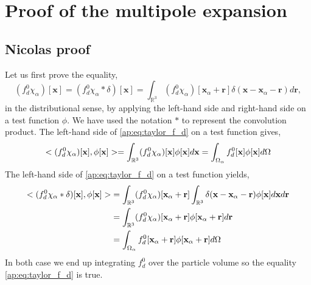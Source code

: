 \section{Proof of the multipole expansion}
\subsection{Nicolas proof}
Let us first prove the equality, 
\begin{equation}
    (f^0_d \chi_\alpha)[\textbf{x}]
    =
    (f^0_d \chi_\alpha * \delta)[\textbf{x}]
    =
    \int_{\mathbb{R}^3} 
     (f^0_d \chi_\alpha)[\textbf{x}_\alpha + \textbf{r}]\delta(\textbf{x} - \textbf{x}_\alpha - \textbf{r}) 
     d\textbf{r},
    \label{ap:eq:taylor_f_d}
\end{equation}
in the distributional sense, by applying the left-hand side and right-hand side on a test function $\phi$.
We have used the notation $*$ to represent the convolution product. 
The left-hand side of \ref{ap:eq:taylor_f_d} on a test function gives, 
\begin{equation}
    < (f^0_d \chi_\alpha)[\textbf{x}], \phi[\textbf{x}]>
    = \int_{\mathbb{R}^3}
    (f^0_d \chi_\alpha)[\textbf{x}] \phi[\textbf{x}]
    d\textbf{x}
    = \int_{\Omega_{\alpha}} 
        f^0_d [\textbf{x}] \phi[\textbf{x}]
         d\Omega
\end{equation}
The left-hand side of \ref{ap:eq:taylor_f_d} on a test function yields, 
\begin{align}
    <   (f^0_d \chi_\alpha *\delta)[\textbf{x}]
    , \phi[\textbf{x}]>
    &= 
    \int_{\mathbb{R}^3}
    (f^0_d \chi_\alpha)[\textbf{x}_\alpha + \textbf{r}]
    \int_{\mathbb{R}^3} 
     \delta(\textbf{x} - \textbf{x}_\alpha - \textbf{r}) 
     \phi[\textbf{x}]
     d\textbf{x}
     d\textbf{r}\\
    &= 
    \int_{\mathbb{R}^3}
    (f^0_d \chi_\alpha)[\textbf{x}_\alpha + \textbf{r}]
     \phi[\textbf{x}_\alpha + \textbf{r}]
     d\textbf{r}
    \\
    &=\intO{
        f^0_d [\textbf{x}_\alpha + \textbf{r}]
        \phi[\textbf{x}_\alpha + \textbf{r}]
    }
    \label{eq:second_equality}
\end{align}
In both case we end up integrating $f_d^0$ over the particle volume so the equality \ref{ap:eq:taylor_f_d} is true. 


